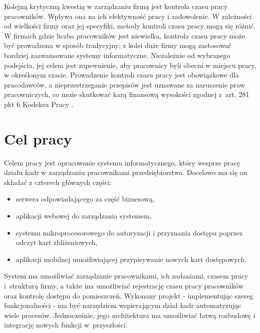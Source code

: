 Kolejną krytyczną kwestią w zarządzaniu firmą jest kontrola czasu pracy pracowników. Wpływa ona na ich efektywność pracy i zadowolenie. W zależności od wielkości firmy oraz jej specyfiki, metody kontroli czasu pracy mogą się różnić. W firmach gdzie liczba pracowników jest niewielka, kontrola czasu pracy może być prowadzona w sposób tradycyjny; z kolei duże firmy mogą zastosować bardziej zaawansowane systemy informatyczne. Niezależnie od wybranego podejścia, jej celem jest zapewnienie, aby pracownicy byli obecni w miejscu pracy, w określonym czasie. Prowadzenie kontroli czasu pracy jest obowiązkowe dla pracodawców, a nieprzestrzeganie przepisów jest uznawane za naruszenie praw pracowniczych, co może skutkować karą finansową wysokości zgodnej z~art. 281 pkt 6 Kodeksu Pracy \cite{bib:KodeksPracy}.

\section{Cel pracy}




Celem pracy jest opracowanie systemu informatycznego, który wesprze pracę działu kadr w zarządzaniu pracownikami przedsiębiorstwa. Docelowo ma się on składać z czterech głównych części:

\begin{itemize}
    \item serwera odpowiadającego za część biznesową,
    \item aplikacji webowej do zarządzania systemem,
    \item systemu mikroprocesorowego do autoryzacji i przyznania dostępu poprzez odczyt kart zbliżeniowych,
    \item aplikacji mobilnej umożliwiającej przypisywanie nowych kart dostępowych.
\end{itemize}

System ma umożliwiać zarządzanie pracownikami, ich zadaniami, czasem pracy i~strukturą firmy, a także ma umożliwiać rejestrację czasu pracy pracowników oraz kontrolę dostępu do pomieszczeń. Wykonany projekt - implementując szereg funkcjonalności - ma być narzędziem wspierającym dział kadr automatyzując wiele procesów. Jednocześnie, jego architektura ma umożliwiać łatwą rozbudowę i integrację nowych funkcji w~przyszłości.

